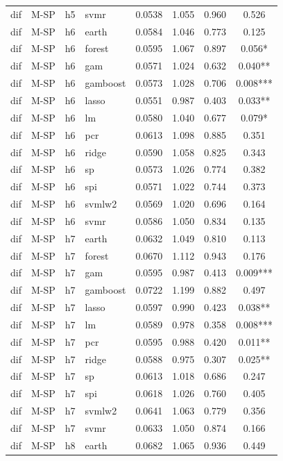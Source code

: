 \begin{ThreePartTable}
\begin{longtable}[t]{llclcccc}
dif & M-SP & h5 & svmr & 0.0538 & 1.055 & 0.960 & 0.526\\
\addlinespace
dif & M-SP & h6 & earth & 0.0584 & 1.046 & 0.773 & 0.125\\
dif & M-SP & h6 & forest & 0.0595 & 1.067 & 0.897 & 0.056*\\
dif & M-SP & h6 & gam & 0.0571 & 1.024 & 0.632 & 0.040**\\
dif & M-SP & h6 & gamboost & 0.0573 & 1.028 & 0.706 & 0.008***\\
dif & M-SP & h6 & lasso & 0.0551 & 0.987 & 0.403 & 0.033**\\
dif & M-SP & h6 & lm & 0.0580 & 1.040 & 0.677 & 0.079*\\
dif & M-SP & h6 & pcr & 0.0613 & 1.098 & 0.885 & 0.351\\
dif & M-SP & h6 & ridge & 0.0590 & 1.058 & 0.825 & 0.343\\
dif & M-SP & h6 & sp & 0.0573 & 1.026 & 0.774 & 0.382\\
dif & M-SP & h6 & spi & 0.0571 & 1.022 & 0.744 & 0.373\\
dif & M-SP & h6 & svmlw2 & 0.0569 & 1.020 & 0.696 & 0.164\\
dif & M-SP & h6 & svmr & 0.0586 & 1.050 & 0.834 & 0.135\\
\addlinespace
dif & M-SP & h7 & earth & 0.0632 & 1.049 & 0.810 & 0.113\\
dif & M-SP & h7 & forest & 0.0670 & 1.112 & 0.943 & 0.176\\
dif & M-SP & h7 & gam & 0.0595 & 0.987 & 0.413 & 0.009***\\
dif & M-SP & h7 & gamboost & 0.0722 & 1.199 & 0.882 & 0.497\\
dif & M-SP & h7 & lasso & 0.0597 & 0.990 & 0.423 & 0.038**\\
dif & M-SP & h7 & lm & 0.0589 & 0.978 & 0.358 & 0.008***\\
dif & M-SP & h7 & pcr & 0.0595 & 0.988 & 0.420 & 0.011**\\
dif & M-SP & h7 & ridge & 0.0588 & 0.975 & 0.307 & 0.025**\\
dif & M-SP & h7 & sp & 0.0613 & 1.018 & 0.686 & 0.247\\
dif & M-SP & h7 & spi & 0.0618 & 1.026 & 0.760 & 0.405\\
dif & M-SP & h7 & svmlw2 & 0.0641 & 1.063 & 0.779 & 0.356\\
dif & M-SP & h7 & svmr & 0.0633 & 1.050 & 0.874 & 0.166\\
\addlinespace
dif & M-SP & h8 & earth & 0.0682 & 1.065 & 0.936 & 0.449\\

\end{longtable}
\end{ThreePartTable}
